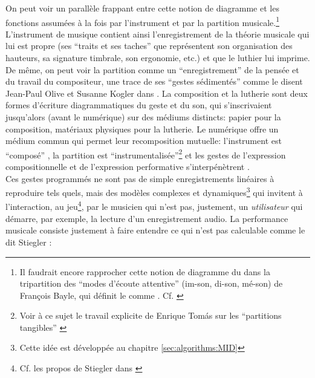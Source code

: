\indent On peut voir un parallèle frappant entre cette notion de diagramme et les fonctions assumées à la fois par l'instrument et par la partition musicale.\footnote{Il faudrait encore rapprocher cette notion de diagramme du  dans la tripartition des ``modes d'écoute attentive'' (im-son, di-son, mé-son) de François Bayle, qui définit le  comme . Cf. \cite{bayle_musique_1993}} L'instrument de musique contient ainsi l'enregistrement de la théorie musicale qui lui est propre (ses ``traits et ses taches'' que représentent son organisation des hauteurs, sa signature timbrale, son ergonomie, etc.) et que le luthier lui imprime. De même, on peut voir la partition comme un ``enregistrement'' de la pensée et du travail du compositeur, une trace de ses ``gestes sédimentés'' comme le disent Jean-Paul Olive et Susanne Kogler dans \cite{olive_expression_2013}. La composition et la lutherie sont deux formes d’écriture diagrammatiques du geste et du son, qui s’inscrivaient jusqu’alors (avant le numérique) sur des médiums distincts: papier pour la composition, matériaux physiques pour la lutherie. Le numérique offre un médium commun qui permet leur recomposition mutuelle: l'instrument est ``composé'' \cite{schnell_introducing_2002}, la partition est ``instrumentalisée''\footnote{Voir à ce sujet le travail explicite de Enrique Tomás sur les ``partitions tangibles'' \cite{tomas_tangible_2014}} et les gestes de l'expression compositionnelle et de l'expression performative s'interpénètrent \cite{dobrian_e_2006}.\\
\indent Ces gestes programmés ne sont pas de simple enregistrements linéaires à reproduire tels quels, mais des modèles complexes et dynamiques\footnote{Cette idée est développée au chapitre \ref{sec:algorithms:MID}} qui invitent à l'interaction, au jeu\footnote{Cf. les propos de Stiegler dans \cite{stiegler_circuit_2004} }, par le musicien qui n'est pas, justement, un \textit{utilisateur} qui démarre, par exemple, la lecture d'un enregistrement audio. La performance musicale consiste justement à faire entendre ce qui n'est pas calculable comme le dit Stiegler \cite{stiegler_circuit_2004}: \\
